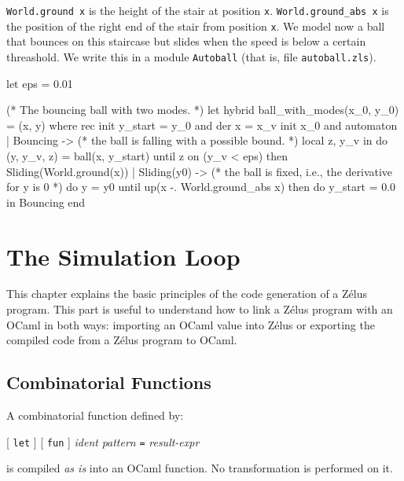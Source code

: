 \documentclass[11pt,titlepage,twoside]{report}
\newcommand{\zelus}{{\sf Z\'elus}}
\newcommand{\ocaml}{{\sf OCaml}}
\newcommand{\term}[1]{{\tt #1}}
\newcommand{\nterm}[1]{{\em #1}}
\begin{document}
\verb-World.ground x- is the height of the stair at position
\verb-x-. \verb-World.ground_abs x- is the position of the right end of the
stair from position \verb-x-. We model now a ball that bounces on this
staircase but slides when the speed is below a certain threashold. We
write this in a module \verb-Autoball- (that is, file
\verb-autoball.zls-).

\begin{runverbatim}
let eps = 0.01

(* The bouncing ball with two modes. *)
let hybrid ball_with_modes(x_0, y_0) = (x, y) where
  rec init y_start = y_0 
  and der x = x_v init x_0
  and automaton
      | Bouncing ->
         (* the ball is falling with a possible bound. *)
         local z, y_v in
         do (y, y_v, z) = ball(x, y_start)
         until z on (y_v < eps) then Sliding(World.ground(x))
      | Sliding(y0) ->
         (* the ball is fixed, i.e., the derivative for y is 0 *)
         do 
           y = y0 
         until up(x -. World.ground_abs x)
         then do y_start = 0.0 in Bouncing
      end
\end{runverbatim}

\chapter{The Simulation Loop}\label{chap:simulation-loop} %

This chapter explains the basic principles of the code generation of a \zelus{}
program. This part is useful to understand how to link a \zelus{} program
with an \ocaml{} in both ways: importing an \ocaml{} value into \zelus{}
or exporting the compiled code from a \zelus{} program to \ocaml.

\section{Combinatorial Functions}
A combinatorial function defined by:
\begin{center}
  [ \term{let} ] [ \term{fun} ] \nterm{ident} \nterm{pattern} \term{=}
  \nterm{result-expr}
\end{center}

is compiled \emph{as is} into an \ocaml{} function. No transformation is
performed on it.
\end{document}
